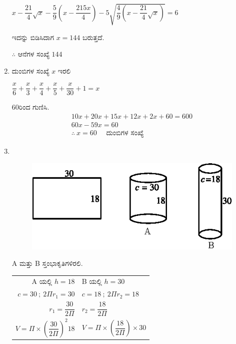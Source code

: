 \begin{enumerate}
$x - \dfrac{21}{4} \sqrt{x} - \dfrac{5}{9} \left(x - \dfrac{215x}{4}\right) - 5 \sqrt{\dfrac{4}{9} \left(x - \dfrac{21}{4} \sqrt{x}\right)} = 6$

\vskip 0.1cm

ಇದನ್ನು ಬಿಡಿಸಿದಾಗ $x = 144$ ಬರುತ್ತದೆ. 

$\therefore$ ಆನೆಗಳ ಸಂಖ್ಯೆ $144$

\item ದುಂಬಿಗಳ ಸಂಖ್ಯೆ $x$ ಇರಲಿ 

\vskip 0.2cm

$\dfrac{x}{6} + \dfrac{x}{3} + \dfrac{x}{4} + \dfrac{x}{5} + \dfrac{x}{30} + 1 = x$

\vskip 0.2cm

60ರಿಂದ ಗುಣಿಸಿ. 
\begin{gather*}
10x + 20x + 15x + 12x + 2x + 60 = 600\\
60x - 59x = 60\\
\therefore~ x = 60 \quad\text{ ದುಂಬಿಗಳ ಸಂಖ್ಯೆ}
\end{gather*}

\item 
~

\begin{figure}[H]
\centering
\includegraphics[scale=1.2]{images/chap9/ans26.eps}
\end{figure}

A ಮತ್ತು B ಸ್ತಂಭಾಕೃತಿಗಳಿರಲಿ. 

\begin{tabular}[t]{rl}
A ಯಲ್ಲಿ \quad $h = 18$ & B ಯಲ್ಲಿ \quad $h = 30$\\[0.1cm]
$c = 30 ~;~ 2\Pi r_{1} = 30$  & $c = 18 ~;~ 2\Pi r_{2} = 18$\\[0.1cm]
$r_{1} = \dfrac{30}{2\Pi}$ & $r_{2} = \dfrac{18}{2\Pi}$\\[0.2cm]
$V = \Pi\times \left(\dfrac{30}{2\Pi}\right)^{2} 18$ & $V = \Pi\times \left(\dfrac{18}{2\Pi}\right) \times 30$
\end{tabular}


\end{enumerate}
